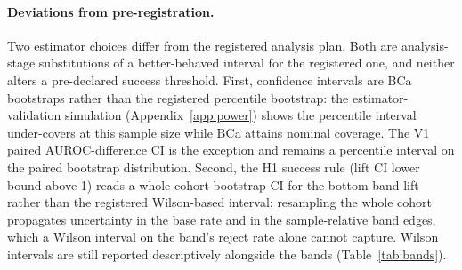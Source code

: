 \paragraph{Deviations from pre-registration.}
Two estimator choices differ from the registered analysis plan. Both are
analysis-stage substitutions of a better-behaved interval for the registered
one, and neither alters a pre-declared success threshold. First, confidence
intervals are BCa bootstraps rather than the registered percentile bootstrap:
the estimator-validation simulation (Appendix~\ref{app:power}) shows the
percentile interval under-covers at this sample size while BCa attains nominal
coverage. The V1 paired AUROC-difference CI is the exception and remains a
percentile interval on the paired bootstrap distribution. Second, the H1
success rule (lift CI lower bound above 1) reads a whole-cohort bootstrap CI
for the bottom-band lift rather than the registered Wilson-based interval:
resampling the whole cohort propagates uncertainty in the base rate and in the
sample-relative band edges, which a Wilson interval on the band's reject rate
alone cannot capture. Wilson intervals are still reported descriptively
alongside the bands (Table~\ref{tab:bands}).
